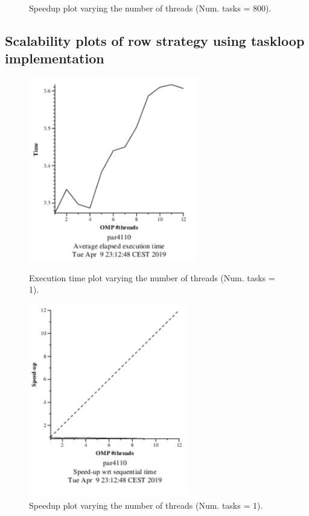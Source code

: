 \documentclass[12pt, a4paper]{article}
\begin{document}
\begin{figure}[H]
\begin{minipage}[b]{0.4\linewidth}
  \caption{Speedup plot varying the number of threads (Num. tasks = 800).}
  \label{fig:mandel-omp-10000-strong-omp-24-800-speedup}
\end{minipage}
\end{figure}






\subsection{Scalability plots of row strategy using taskloop implementation}
\label{sec:row_taskloop_scalability_plots}
\begin{figure}[H]
\centering
\begin{minipage}[t]{0.4\linewidth}
  \centering
  \includegraphics[scale=1.5]{./mandel-omp-10000-strong-omp-3-1-time}
  \caption{Execution time plot varying the number of threads (Num. tasks = 1).}
  \label{fig:mandel-omp-10000-strong-omp-3-1-time}
\end{minipage}%
\hspace{0.5cm}
\begin{minipage}[t]{0.4\linewidth}
  \centering
  \includegraphics[scale=1.5]{./mandel-omp-10000-strong-omp-3-1-speedup}
  \caption{Speedup plot varying the number of threads (Num. tasks = 1).}
  \label{fig:mandel-omp-10000-strong-omp-3-1-speedup}
\end{minipage}
\end{figure}
\end{document}
